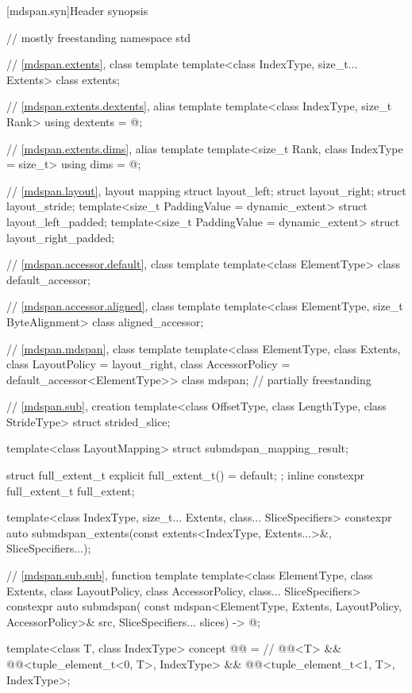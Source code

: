[mdspan.syn]{Header  synopsis}

%
\begin{codeblock}
// mostly freestanding
namespace std {
  // \ref{mdspan.extents}, class template 
  template<class IndexType, size_t... Extents>
    class extents;

  // \ref{mdspan.extents.dextents}, alias template 
  template<class IndexType, size_t Rank>
    using dextents = @\seebelow@;

  // \ref{mdspan.extents.dims}, alias template 
  template<size_t Rank, class IndexType = size_t>
    using dims = @\seebelow@;

  // \ref{mdspan.layout}, layout mapping
  struct layout_left;
  struct layout_right;
  struct layout_stride;
  template<size_t PaddingValue = dynamic_extent>
    struct layout_left_padded;
  template<size_t PaddingValue = dynamic_extent>
    struct layout_right_padded;

  // \ref{mdspan.accessor.default}, class template 
  template<class ElementType>
    class default_accessor;

  // \ref{mdspan.accessor.aligned}, class template 
  template<class ElementType, size_t ByteAlignment>
    class aligned_accessor;

  // \ref{mdspan.mdspan}, class template 
  template<class ElementType, class Extents, class LayoutPolicy = layout_right,
           class AccessorPolicy = default_accessor<ElementType>>
    class mdspan;                                                           // partially freestanding

  // \ref{mdspan.sub},  creation
  template<class OffsetType, class LengthType, class StrideType>
    struct strided_slice;

  template<class LayoutMapping>
    struct submdspan_mapping_result;

  struct full_extent_t { explicit full_extent_t() = default; };
  inline constexpr full_extent_t full_extent{};

  template<class IndexType, size_t... Extents, class... SliceSpecifiers>
    constexpr auto submdspan_extents(const extents<IndexType, Extents...>&, SliceSpecifiers...);

  // \ref{mdspan.sub.sub},  function template
  template<class ElementType, class Extents, class LayoutPolicy,
           class AccessorPolicy, class... SliceSpecifiers>
    constexpr auto submdspan(
      const mdspan<ElementType, Extents, LayoutPolicy, AccessorPolicy>& src,
      SliceSpecifiers... slices) -> @\seebelow@;

  template<class T, class IndexType>
    concept @@ =               // \expos
      @@<T> &&
      @@<tuple_element_t<0, T>, IndexType> &&
      @@<tuple_element_t<1, T>, IndexType>;
}
\end{codeblock}


